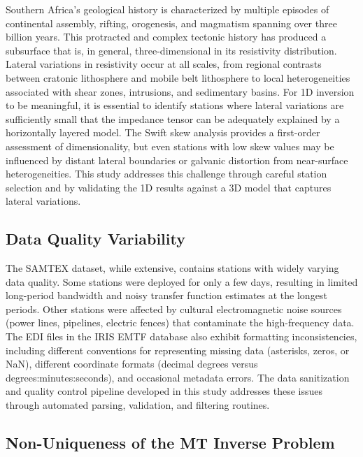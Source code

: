 Southern Africa's geological history is characterized by multiple episodes of continental assembly, rifting, orogenesis, and magmatism spanning over three billion years. This protracted and complex tectonic history has produced a subsurface that is, in general, three-dimensional in its resistivity distribution. Lateral variations in resistivity occur at all scales, from regional contrasts between cratonic lithosphere and mobile belt lithosphere to local heterogeneities associated with shear zones, intrusions, and sedimentary basins. For 1D inversion to be meaningful, it is essential to identify stations where lateral variations are sufficiently small that the impedance tensor can be adequately explained by a horizontally layered model. The Swift skew analysis provides a first-order assessment of dimensionality, but even stations with low skew values may be influenced by distant lateral boundaries or galvanic distortion from near-surface heterogeneities. This study addresses this challenge through careful station selection and by validating the 1D results against a 3D model that captures lateral variations.

\subsection*{Data Quality Variability}

The SAMTEX dataset, while extensive, contains stations with widely varying data quality. Some stations were deployed for only a few days, resulting in limited long-period bandwidth and noisy transfer function estimates at the longest periods. Other stations were affected by cultural electromagnetic noise sources (power lines, pipelines, electric fences) that contaminate the high-frequency data. The EDI files in the IRIS EMTF database also exhibit formatting inconsistencies, including different conventions for representing missing data (asterisks, zeros, or NaN), different coordinate formats (decimal degrees versus degrees:minutes:seconds), and occasional metadata errors. The data sanitization and quality control pipeline developed in this study addresses these issues through automated parsing, validation, and filtering routines.

\subsection*{Non-Uniqueness of the MT Inverse Problem}

